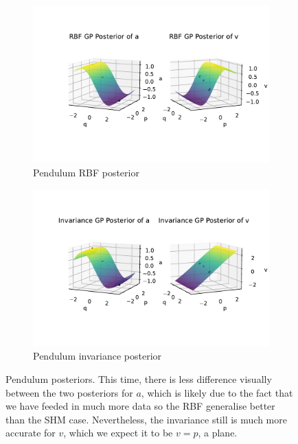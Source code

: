 \documentclass{statsmsc}
\begin{document}
\begin{figure}[H]
     \centering
     \begin{subfigure}[b]{\linewidth}
        \centering
        \includegraphics[width=\linewidth]{../codes/figures/posterior_pendulum_rbf.pdf}
        \caption{Pendulum RBF posterior}
        \label{fig:posterior_pendulum_rbf}
     \end{subfigure}
     \hfill
     \begin{subfigure}[b]{\linewidth}
         \centering
         \includegraphics[width=\linewidth]{../codes/figures/posterior_pendulum_invariance.pdf}
         \caption{Pendulum invariance posterior}
         \label{fig:posterior_pendulum_invariance}
     \end{subfigure}
        \caption{Pendulum posteriors. This time, there is less difference visually between the two posteriors for $a$, which is likely due to the fact that we have feeded in much more data so the RBF generalise better than the SHM case. Nevertheless, the invariance still is much more accurate for $v$, which we expect it to be $v=p$, a plane.}
        \label{fig:posterior_pendulum}
\end{figure}
\end{document}

